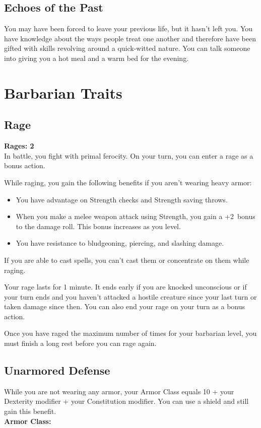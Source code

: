 \documentclass[letterpaper,openany,oneside,twocolumn]{book}
\begin{document}
\subsection*{Echoes of the Past}
You may have been forced to leave your previous life, but it hasn't left you. You have knowledge about the ways people treat one another and therefore have been gifted with skills revolving around a quick-witted nature. You can talk someone into giving you a hot meal and a warm bed for the evening.

\section*{Barbarian Traits}
\subsection*{Rage}
\newcommand{\RageModifier}{2}
\textbf{Rages: 2}\\
In battle, you fight with primal ferocity. On your turn, you can enter a rage as a bonus action.

While raging, you gain the following benefits if you aren't wearing heavy armor:

\begin{itemize}
	\item You have advantage on Strength checks and Strength saving throws.
	\item When you make a melee weapon attack using Strength, you gain a +\RageModifier ~bonus to the damage roll. This bonus increases as you level.
	\item You have resistance to bludgeoning, piercing, and slashing damage.
\end{itemize}

If you are able to cast spells, you can't cast them or concentrate on them while raging.

Your rage lasts for 1 minute. It ends early if you are knocked unconscious or if your turn ends and you haven't attacked a hostile creature since your last turn or taken damage since then. You can also end your rage on your turn as a bonus action.

Once you have raged the maximum number of times for your barbarian level, you must finish a long rest before you can rage again.
\subsection*{Unarmored Defense}
While you are not wearing any armor, your Armor Class equals 10 + your Dexterity modifier + your Constitution modifier. You can use a shield and still gain this benefit.\\
\textbf{Armor Class: }
\end{document}
